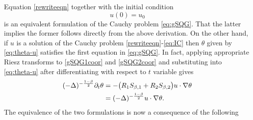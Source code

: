 \documentclass[11pt]{amsart}
\numberwithin{equation}{section}
\begin{document}
		Equation \eqref{rewriteeqn} together with the initial condition 
		\begin{equation}\label{eq:IC}
		u(0)=u_0
		\end{equation} is an equivalent formulation of the Cauchy problem \eqref{eq:gSQG}.  That the latter implies the former follows directly from the above derivation. On the other hand, if $u$ is a solution of the Cauchy problem \eqref{rewriteeqn}-\eqref{eq:IC} then $\theta$ given by \eqref{eq:theta-u} satisfies the first equation in \eqref{eq:gSQG}. In fact, applying appropriate Riesz transforms to \eqref{gSQG1coor} and \eqref{gSQG2coor} and substituting into \eqref{eq:theta-u} after differentiating with respect to $t$ variable gives
        \begin{align}
         (-\Delta)^{-\frac{1-\beta}{2}}\partial_t\theta&=-\big(R_1S_{\beta,1}+R_2S_{\beta,2}\big) u\cdot \nabla\theta\\
            &=(-\Delta)^{-\frac{1-\beta}{2}}u\cdot \nabla\theta. \notag  
        \end{align}
        The equivalence of the two formulations is now a consequence of the following 
\end{document}
